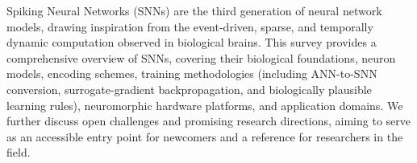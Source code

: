 Spiking Neural Networks (SNNs) are the third generation of neural network
models, drawing inspiration from the event-driven, sparse, and temporally
dynamic computation observed in biological brains. This survey provides a
comprehensive overview of SNNs, covering their biological foundations, neuron
models, encoding schemes, training methodologies (including ANN-to-SNN
conversion, surrogate-gradient backpropagation, and biologically plausible
learning rules), neuromorphic hardware platforms, and application domains.
We further discuss open challenges and promising research directions, aiming
to serve as an accessible entry point for newcomers and a reference for
researchers in the field.
